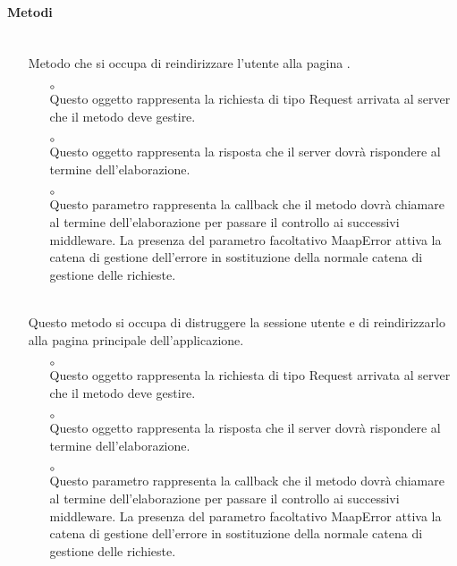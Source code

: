 \paragraph*{Metodi}
\begin{itemize}
\item[]  \\ Metodo che si occupa di reindirizzare l'utente alla pagina .
\begin{itemize}\addtolength{\itemsep}{-0.5\baselineskip}
\item[$\circ$]  \\ Questo oggetto rappresenta la richiesta di tipo Request arrivata al server che il metodo deve gestire.
\item[$\circ$]  \\ Questo oggetto rappresenta la risposta che il server dovrà rispondere al termine dell'elaborazione.
\item[$\circ$]  \\ Questo parametro rappresenta la callback che il metodo dovrà chiamare al termine dell'elaborazione per passare il controllo ai successivi middleware. La presenza del parametro facoltativo MaapError attiva la catena di gestione dell'errore in sostituzione della normale catena di gestione delle richieste.
\end{itemize}
\item[]  \\ Questo metodo si occupa di distruggere la sessione utente e di reindirizzarlo alla pagina principale dell'applicazione.
\begin{itemize}\addtolength{\itemsep}{-0.5\baselineskip}
\item[$\circ$]  \\ Questo oggetto rappresenta la richiesta di tipo Request arrivata al server che il metodo deve gestire.
\item[$\circ$]  \\ Questo oggetto rappresenta la risposta che il server dovrà rispondere al termine dell'elaborazione.
\item[$\circ$]  \\ Questo parametro rappresenta la callback che il metodo dovrà chiamare al termine dell'elaborazione per passare il controllo ai successivi middleware. La presenza del parametro facoltativo MaapError attiva la catena di gestione dell'errore in sostituzione della normale catena di gestione delle richieste.

\end{itemize}
\end{itemize}

